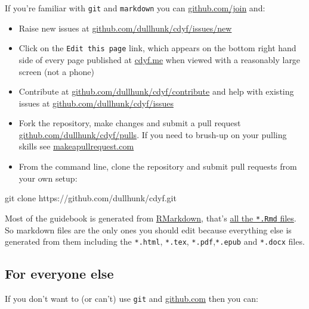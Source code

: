 \documentclass[
]{book}
\newenvironment{Shaded}{\begin{snugshade}}{\end{snugshade}}
\newcommand{\NormalTok}[1]{#1}
\providecommand{\tightlist}{%
  \setlength{\itemsep}{0pt}\setlength{\parskip}{0pt}}
\begin{document}
If you're familiar with \texttt{git} and \texttt{markdown} you can \href{https://github.com/join}{github.com/join} and:

\begin{itemize}
\tightlist
\item
  Raise new issues at \href{https://github.com/dullhunk/cdyf/issues/new}{github.com/dullhunk/cdyf/issues/new}
\item
  Click on the \texttt{Edit\ this\ page} link, which appears on the bottom right hand side of every page published at \href{https://www.cdyf.me}{cdyf.me} when viewed with a reasonably large screen (not a phone)
\item
  Contribute at \href{https://github.com/dullhunk/cdyf/contribute}{github.com/dullhunk/cdyf/contribute} and help with existing issues at \href{https://github.com/dullhunk/cdyf/issues}{github.com/dullhunk/cdyf/issues}
\item
  Fork the repository, make changes and submit a pull request \href{https://github.com/dullhunk/cdyf/pulls}{github.com/dullhunk/cdyf/pulls}. If you need to brush-up on your pulling skills see \href{http://makeapullrequest.com/}{makeapullrequest.com}
\item
  From the command line, clone the repository and submit pull requests from your own setup:
\end{itemize}

\begin{Shaded}
\begin{Highlighting}[]
\NormalTok{git clone https://github.com/dullhunk/cdyf.git}
\end{Highlighting}
\end{Shaded}

Most of the guidebook is generated from \href{https://en.wikipedia.org/wiki/Markdown}{RMarkdown}, that's \href{https://github.com/dullhunk/cdyf/search?l=RMarkdown}{all the \texttt{*.Rmd} files}. So markdown files are the only ones you should edit because everything else is generated from them including the \texttt{*.html}, \texttt{*.tex}, \texttt{*.pdf},\texttt{*.epub} and \texttt{*.docx} files.

\hypertarget{elseif}{%
\subsection{For everyone else}\label{elseif}}

If you don't want to (or can't) use \texttt{git} and \href{https://github.com/}{github.com} then you can:
\end{document}
